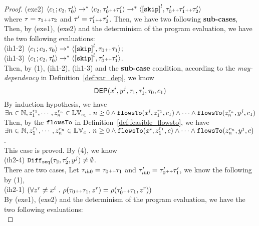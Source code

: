 \begin{proof}
  (exe2) $\config{{c_1}; {c_2}, \trace_0'}
  \rightarrow^{*} \config{c_2, \trace_0'  \tracecat \trace_1'}
  \rightarrow^{*} \config{\clabel{\eskip}^l, \trace_0'  \tracecat \trace_1' \tracecat \trace_2'}$ 
  \\
  where $\mathtt{\tau} = \mathtt{\tau}_1 {\scriptscriptstyle ++} \mathtt{\tau}_2$ 
  and $\mathtt{\tau}' = \mathtt{\tau}_1' {\scriptscriptstyle ++} \mathtt{\tau}_2'$.
Then, we have two following \textbf{sub-cases},
Then, by (exe1), (exe2) and the determinism of the program evaluation, we have the two following evaluations:
\\
(ih1-2) $\config{c_1;c_2 , \trace_0} 
\rightarrow^{*} \config{\clabel{\eskip}^l, \trace_0  \tracecat \trace_1}$;
\\
(ih1-3) $\config{c_1;c_2, \trace_0'}
\rightarrow^{*} \config{\clabel{\eskip}^l, \trace_0'  \tracecat \trace_1'}$.
\\
Then, by (1), (ih1-2), (ih1-3) and the \textbf{sub-case} condition, 
according to the \emph{may-dependency} in Definition~\ref{def:var_dep}, we know
\[
  \mathsf{DEP}(x^i, y^j, \mathtt{\tau}_1, \mathtt{\tau}_1', \mathtt{\tau}_0, c_1)
\]
By induction hypothesis, we have 
\\
$\exists n \in \mathbb{N}, z_1^{r_1}, \cdots, z_n^{r_n} \in \mathbb{LV}_{{c_1}} ~.~   n \geq 0 \land
\mathtt{flowsTo}(x^i,  z_1^{r_1}, c_1) 
\land \cdots \land \mathtt{flowsTo}(z_n^{r_n}, y^j, c_1)$
\\
Then, by the $\mathtt{flowsTo}$ in Definition~\ref{def:feasible_flowsto}, we have 
\\
$\exists n \in \mathbb{N}, z_1^{r_1}, \cdots, z_n^{r_n} \in \mathbb{LV}_{{c}} ~.~   n \geq 0 \land
\mathtt{flowsTo}(x^i,  z_1^{r_1}, c) 
\land \cdots \land \mathtt{flowsTo}(z_n^{r_n}, y^j, c)$.
\\
This case is proved.
By (4), we know 
\\
(ih2-4) $\mathtt{Diff}_{\mathtt{seq}}(\mathtt{\tau}_2, \mathtt{\tau}_2', y^j ) \neq \emptyset$.
\\
There are two cases, 
%
Let $\mathtt{\tau}_{ih0} = \mathtt{\tau}_0 {\scriptscriptstyle ++} \mathtt{\tau}_1$ and $\mathtt{\tau}_{ih0}' = \mathtt{\tau}_0' {\scriptscriptstyle ++} \mathtt{\tau}_1'$, we know the following 
by (1),
\\
(ih2-1) 
$ (\forall z^r \neq x^i ~.~     
\rho(\mathtt{\tau}_0 {\scriptscriptstyle ++} \mathtt{\tau}_1, z^r ) =   \rho(\mathtt{\tau}_0' {\scriptscriptstyle ++} \mathtt{\tau}_1,z^r) )$
\\
By (exe1), (exe2) and the determinism of the program evaluation, we have the two following evaluations:
\\

\end{proof}
